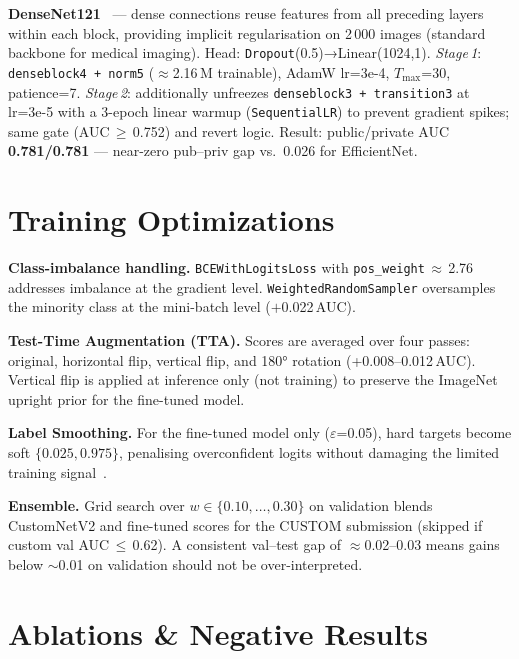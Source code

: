 \documentclass[a4paper, 10pt, twocolumn]{article}
\begin{document}
\textbf{DenseNet121}~\cite{huang2017densely} — dense connections reuse
features from all preceding layers within each block, providing implicit
regularisation on 2\,000 images (standard backbone for medical imaging).
Head: \texttt{Dropout}(0.5)→Linear(1024,1).
\emph{Stage\,1}: \texttt{denseblock4\,+\,norm5} ($\approx$2.16\,M trainable),
AdamW lr=3e-4, $T_\text{max}$=30, patience=7.
\emph{Stage\,2}: additionally unfreezes \texttt{denseblock3\,+\,transition3}
at lr=3e-5 with a 3-epoch linear warmup (\texttt{SequentialLR}) to prevent
gradient spikes; same gate (AUC\,$\geq$\,0.752) and revert logic.
Result: public/private AUC \textbf{0.781/0.781} — near-zero pub--priv gap
vs.\ 0.026 for EfficientNet.

\section{Training Optimizations}

\textbf{Class-imbalance handling.}
\texttt{BCEWithLogitsLoss} with \texttt{pos\_weight}\,$\approx$\,2.76
addresses imbalance at the gradient level. \texttt{WeightedRandomSampler}
oversamples the minority class at the mini-batch level ($+$0.022\,AUC).

\textbf{Test-Time Augmentation (TTA).}
Scores are averaged over four passes: original, horizontal flip, vertical
flip, and 180° rotation (+0.008--0.012\,AUC). Vertical flip is applied at
inference only (not training) to preserve the ImageNet upright prior for
the fine-tuned model.

\textbf{Label Smoothing.}
For the fine-tuned model only ($\varepsilon$=0.05), hard targets become
soft $\{0.025, 0.975\}$, penalising overconfident logits without damaging
the limited training signal~\cite{muller2019label}.

\textbf{Ensemble.}
Grid search over $w\in\{0.10,\ldots,0.30\}$ on validation blends CustomNetV2
and fine-tuned scores for the CUSTOM submission (skipped if custom val
AUC\,$\leq$\,0.62). A consistent val--test gap of $\approx$0.02--0.03 means
gains below $\sim$0.01 on validation should not be over-interpreted.

\section{Ablations \& Negative Results}
\end{document}
